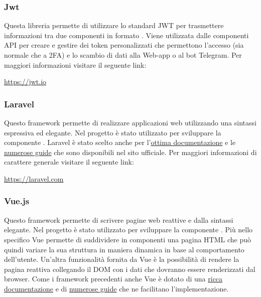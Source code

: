 		\subsubsection{Jwt}
			Questa libreria permette di utilizzare lo standard JWT per trasmettere informazioni tra due componenti in formato . Viene utilizzata dalle componenti API per creare e gestire dei token personalizzati che permettono l'accesso (sia normale che a 2FA) e lo scambio di dati alla Web-app o al bot Telegram.
			\newline
			Per maggiori informazioni visitare il seguente link:
			\newline
			\begin{center}
				\url{https://jwt.io}
			\end{center}
		\subsubsection{Laravel}
			Questo framework permette di realizzare applicazioni web utilizzando una sintassi espressiva ed elegante. Nel progetto è stato utilizzato per sviluppare la componente . Laravel è stato scelto anche per l'\href{https://laravel.com/docs/7.x}{ottima documentazione} e le \href{https://laravel.com/docs/7.x/routing}{numerose guide} che sono disponibili nel sito ufficiale.
			\newline
			Per maggiori informazioni di carattere generale visitare il seguente link:
			\newline
			\begin{center}
				\url{https://laravel.com}
			\end{center}
		\subsubsection{Vue.js}
			Questo framework permette di scrivere pagine web reattive e dalla sintassi elegante. Nel progetto è stato utilizzato per sviluppare la componente . Più nello specifico Vue permette di suddividere in componenti una pagina HTML che può quindi variare la sua struttura in maniera dinamica in base al comportamento dell'utente. Un'altra funzionalità fornita da Vue è la possibilità di rendere la pagina reattiva collegando il DOM con i dati che dovranno essere renderizzati dal browser.
			Come i framework precedenti anche Vue è dotato di una \href{https://vuejs.org/v2/api/}{ricca documentazione} e di \href{https://vuejs.org/v2/guide/index.html}{numerose guide} che ne facilitano l'implementazione. 

